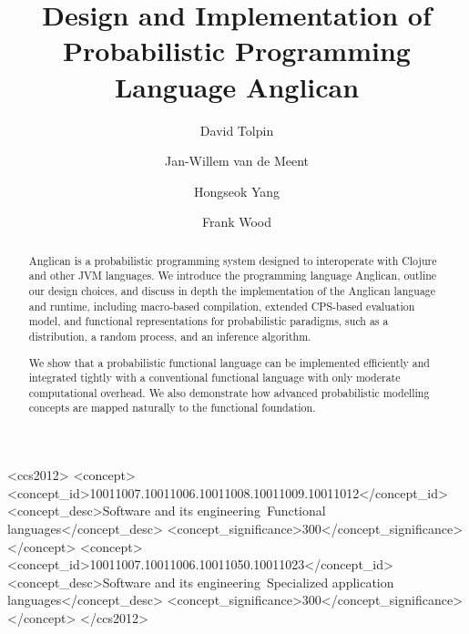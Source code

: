 \documentclass[sigconf]{acmart}
\begin{document}
\title{Design and Implementation of Probabilistic Programming Language Anglican}

\author{David Tolpin}

\author{Jan-Willem van de Meent}

\author{Hongseok Yang}

\author{Frank Wood}

\begin{abstract}
    Anglican is a probabilistic programming system designed to interoperate
    with Clojure and other JVM languages. We introduce the
    programming language Anglican, outline our design choices,
    and discuss in depth the implementation of the Anglican language
    and runtime, including macro-based compilation, extended
    CPS-based evaluation model, and functional representations for
    probabilistic paradigms, such as a distribution,
    a random process, and an inference algorithm.

    We show that a probabilistic functional language can be
    implemented efficiently and integrated tightly with a
    conventional functional language with only moderate
    computational overhead. We also demonstrate how advanced
    probabilistic modelling concepts are mapped naturally
    to the functional foundation.
\end{abstract}



\begin{CCSXML}
<ccs2012>
    <concept>
        <concept_id>10011007.10011006.10011008.10011009.10011012</concept_id>
        <concept_desc>Software and its engineering~Functional languages</concept_desc>
        <concept_significance>300</concept_significance>
    </concept>
    <concept>
        <concept_id>10011007.10011006.10011050.10011023</concept_id>
        <concept_desc>Software and its engineering~Specialized application languages</concept_desc>
        <concept_significance>300</concept_significance>
    </concept>
</ccs2012>
\end{CCSXML}

\end{document}
